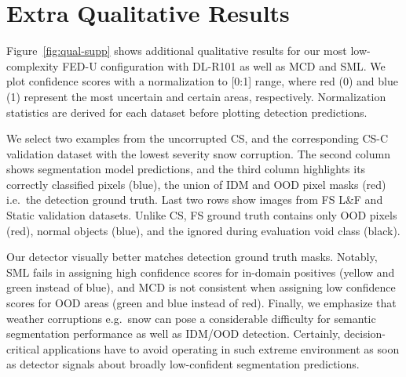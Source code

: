 \documentclass[accepted, startpage]{uai2023}
\newcommand{\eg}{e.g.}
\newcommand{\ie}{i.e.}
\begin{document}
\section{Extra Qualitative Results}
\label{sec:app_qual_supp}
Figure~\ref{fig:qual-supp} shows additional qualitative results for our most low-complexity FED-U configuration with DL-R101 as well as MCD and SML. We plot confidence scores with a normalization to [0:1] range, where red (0) and blue (1) represent the most uncertain and certain areas, respectively. Normalization statistics are derived for each dataset before plotting detection predictions.

We select two examples from the uncorrupted CS, and the corresponding CS-C validation dataset with the lowest severity snow corruption. The second column shows segmentation model predictions, and the third column highlights its correctly classified pixels (blue), the union of IDM and OOD pixel masks (red) \ie~the detection ground truth. Last two rows show images from FS L\&F and Static validation datasets. Unlike CS, FS ground truth contains only OOD pixels (red), normal objects (blue), and the ignored during evaluation void class (black).

Our detector visually better matches detection ground truth masks. Notably, SML fails in assigning high confidence scores for in-domain positives (yellow and green instead of blue), and MCD is not consistent when assigning low confidence scores for OOD areas (green and blue instead of red). Finally, we emphasize that weather corruptions \eg~snow can pose a considerable difficulty for semantic segmentation performance as well as IDM/OOD detection. Certainly, decision-critical applications have to avoid operating in such extreme environment as soon as detector signals about broadly low-confident segmentation predictions.
\clearpage{}
\fi
\end{document}
